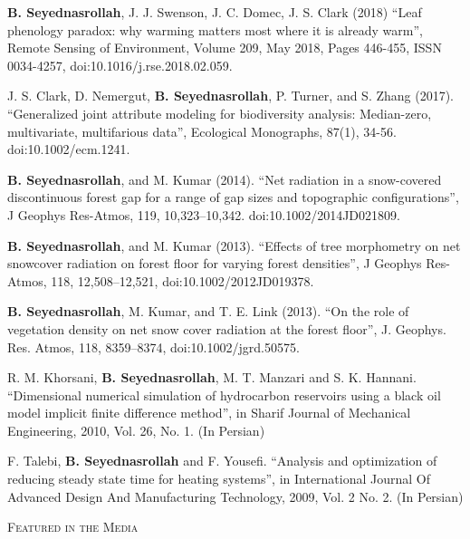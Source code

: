 \documentclass[10pt]{article}
\newenvironment{changemargin}[2]{%
  \begin{list}{}{%
    \setlength{\topsep}{0pt}%
    \setlength{\leftmargin}{#1}%
    \setlength{\rightmargin}{#2}%
    \setlength{\listparindent}{\parindent}%
    \setlength{\itemindent}{\parindent}%
    \setlength{\parsep}{\parskip}%
  }%
  \item[]}{\end{list}
}
\newcommand{\lineover}{
	\begin{changemargin}{-0.05in}{-0.05in}
		\vspace*{-8pt}
		\hrulefill \\
		\vspace*{-2pt}
	\end{changemargin}
}
\newcommand{\header}[1]{
	\begin{changemargin}{-0.5in}{-0.5in}
		\scshape{#1}\\
  	\lineover
	\end{changemargin}
}
\newenvironment{body} {
	\vspace*{-2pt}
	\begin{changemargin}{-0.5in}{-0.5in}
  }
	{\end{changemargin}
}
\begin{document}
\begin{body}
	\textbf{B. Seyednasrollah}, J. J. Swenson, J. C. Domec, J. S. Clark (2018) ``Leaf phenology paradox: why warming matters most where it is already warm'', Remote Sensing of Environment, Volume 209, May 2018, Pages 446-455, ISSN 0034-4257, doi:10.1016/j.rse.2018.02.059.\\
\medskip

	J. S. Clark, D. Nemergut, \textbf{B. Seyednasrollah}, P. Turner, and S. Zhang (2017). ``Generalized joint attribute modeling for biodiversity analysis: Median-zero, multivariate, multifarious data'', Ecological Monographs, 87(1), 34-56. doi:10.1002/ecm.1241.\\
\medskip

	\textbf{B. Seyednasrollah}, and M. Kumar (2014). ``Net radiation in a snow-covered discontinuous forest gap for a range of gap sizes and topographic configurations'', J Geophys Res-Atmos, 119, 10,323–10,342. doi:10.1002/2014JD021809. \\
\medskip

	\textbf{B. Seyednasrollah}, and M. Kumar (2013). ``Effects of tree morphometry on net snowcover radiation on forest floor for varying forest densities'', J Geophys Res-Atmos, 118, 12,508–12,521, doi:10.1002/2012JD019378.\\
\medskip

	\textbf{B. Seyednasrollah}, M. Kumar, and T. E. Link (2013). ``On the role of vegetation density on net snow cover radiation at the forest floor'', J. Geophys. Res. Atmos, 118, 8359–8374, doi:10.1002/jgrd.50575.\\
\medskip

R. M. Khorsani, \textbf{B. Seyednasrollah}, M. T. Manzari and S. K. Hannani. ``Dimensional numerical simulation of hydrocarbon reservoirs using a black oil model implicit finite difference method'', in Sharif Journal of Mechanical Engineering, 2010, Vol. 26, No. 1. (In Persian)\\
\medskip

	 F. Talebi, \textbf{B. Seyednasrollah} and F. Yousefi. ``Analysis and optimization of reducing steady state time for heating systems'', in International Journal Of Advanced Design And Manufacturing Technology, 2009, Vol. 2 No. 2.  (In Persian)\\
\medskip


\end{body}

\medskip


\header{Featured in the Media}
\end{document}
